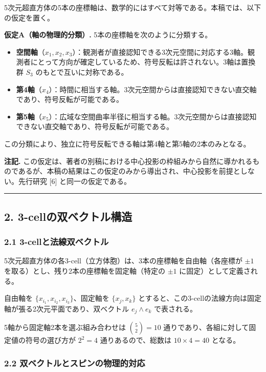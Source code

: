 \documentclass[a4paper,11pt]{ltjsarticle}
\providecommand{\tightlist}{\setlength{\itemsep}{0pt}\setlength{\parskip}{0pt}}
\begin{document}
5次元超直方体の5本の座標軸は、数学的にはすべて対等である。本稿では、以下の仮定を置く。

\textbf{仮定A（軸の物理的分類）.} 5本の座標軸を次のように分類する。

\begin{itemize}
\tightlist
\item
  \textbf{空間軸}（$x_1, x_2, x_3$）：観測者が直接認知できる3次元空間に対応する3軸。観測者にとって方向が確定しているため、符号反転は許されない。3軸は置換群 $S_3$ のもとで互いに対称である。
\item
  \textbf{第4軸}（$x_4$）：時間に相当する軸。3次元空間からは直接認知できない直交軸であり、符号反転が可能である。
\item
  \textbf{第5軸}（$x_5$）：広域な空間曲率半径に相当する軸。3次元空間からは直接認知できない直交軸であり、符号反転が可能である。
\end{itemize}

この分類により、独立に符号反転できる軸は第4軸と第5軸の2本のみとなる。

\textbf{注記.} この仮定は、著者の別稿における中心投影の枠組みから自然に導かれるものであるが、本稿の結果はこの仮定のみから導出され、中心投影を前提としない。先行研究 [6] と同一の仮定である。

\begin{center}\rule{0.5\linewidth}{0.5pt}\end{center}

\subsection*{2. 3-cellの双ベクトル構造}

\subsubsection*{2.1 3-cellと法線双ベクトル}

5次元超直方体の各3-cell（立方体胞）は、3本の座標軸を自由軸（各座標が $\pm 1$ を取る）とし、残り2本の座標軸を固定軸（特定の $\pm 1$ に固定）として定義される。

自由軸を $\{x_{i_1}, x_{i_2}, x_{i_3}\}$、固定軸を $\{x_j, x_k\}$ とすると、この3-cellの法線方向は固定軸が張る2次元平面であり、双ベクトル $e_j \wedge e_k$ で表される。

5軸から固定軸2本を選ぶ組み合わせは $\binom{5}{2} = 10$ 通りであり、各組に対して固定値の符号の選び方が $2^2 = 4$ 通りあるので、総数は $10 \times 4 = 40$ となる。

\subsubsection*{2.2 双ベクトルとスピンの物理的対応}
\end{document}
